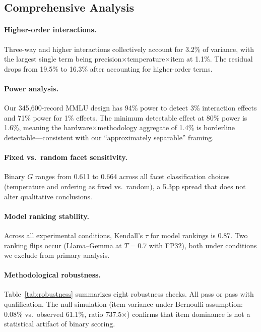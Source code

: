 \documentclass[11pt,letterpaper]{article}
\begin{document}
\subsection{Comprehensive Analysis}

\paragraph{Higher-order interactions.}
Three-way and higher interactions collectively account for 3.2\% of variance, with the largest single term being precision$\times$temperature$\times$item at 1.1\%. The residual drops from 19.5\% to 16.3\% after accounting for higher-order terms.

\paragraph{Power analysis.}
Our 345,600-record MMLU design has 94\% power to detect 3\% interaction effects and 71\% power for 1\% effects. The minimum detectable effect at 80\% power is 1.6\%, meaning the hardware$\times$methodology aggregate of 1.4\% is borderline detectable---consistent with our ``approximately separable'' framing.

\paragraph{Fixed vs.\ random facet sensitivity.}
Binary $G$ ranges from 0.611 to 0.664 across all facet classification choices (temperature and ordering as fixed vs.\ random), a 5.3pp spread that does not alter qualitative conclusions.

\paragraph{Model ranking stability.}
Across all experimental conditions, Kendall's $\tau$ for model rankings is 0.87. Two ranking flips occur (Llama--Gemma at $T = 0.7$ with FP32), both under conditions we exclude from primary analysis.

\paragraph{Methodological robustness.}
Table~\ref{tab:robustness} summarizes eight robustness checks. All pass or pass with qualification. The null simulation (item variance under Bernoulli assumption: 0.08\% vs.\ observed 61.1\%, ratio 737.5$\times$) confirms that item dominance is not a statistical artifact of binary scoring.
\end{document}
